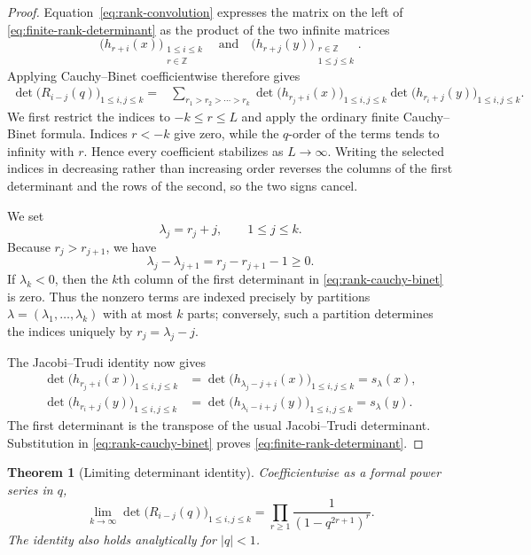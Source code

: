 \documentclass[11pt]{article}
\newtheorem{theorem}{Theorem}[section]
\theoremstyle{definition}
\theoremstyle{remark}
\begin{document}
\begin{proof}
Equation~\eqref{eq:rank-convolution} expresses the matrix on the left of
\eqref{eq:finite-rank-determinant} as the product of the two infinite matrices
\[
 \bigl(h_{r+i}(x)\bigr)_{\substack{1\leq i\leq k\\r\in\mathbb Z}}
 \quad\text{and}\quad
 \bigl(h_{r+j}(y)\bigr)_{\substack{r\in\mathbb Z\\1\leq j\leq k}}.
\]
Applying Cauchy--Binet coefficientwise therefore gives
\begin{align}
 \det\bigl(R_{i-j}(q)\bigr)_{1\leq i,j\leq k}
 ={}&\sum_{r_1>r_2>\cdots>r_k}
 \det\bigl(h_{r_j+i}(x)\bigr)_{1\leq i,j\leq k}
 \det\bigl(h_{r_i+j}(y)\bigr)_{1\leq i,j\leq k}.
 \label{eq:rank-cauchy-binet}
\end{align}
We first restrict the
indices to $-k\leq r\leq L$ and apply the ordinary finite Cauchy--Binet
formula.  Indices $r<-k$ give zero, while the $q$-order of the terms tends to
infinity with $r$.  Hence every coefficient stabilizes as $L\to\infty$.
Writing the selected indices in decreasing rather than increasing order
reverses the columns of the first determinant and the rows of the second, so
the two signs cancel.

We set
\[
 \lambda_j=r_j+j,
 \qquad 1\leq j\leq k.
\]
Because $r_j>r_{j+1}$, we have
\[
 \lambda_j-\lambda_{j+1}=r_j-r_{j+1}-1\geq0.
\]
If $\lambda_k<0$, then the $k$th column of the first determinant in
\eqref{eq:rank-cauchy-binet} is zero.  Thus the nonzero terms are indexed
precisely by partitions $\lambda=(\lambda_1,\ldots,\lambda_k)$ with at most
$k$ parts; conversely, such a partition determines the indices uniquely by
$r_j=\lambda_j-j$.

The Jacobi--Trudi identity now gives
\begin{align*}
 \det\bigl(h_{r_j+i}(x)\bigr)_{1\leq i,j\leq k}
 &=\det\bigl(h_{\lambda_j-j+i}(x)\bigr)_{1\leq i,j\leq k}
 =s_\lambda(x),\\
 \det\bigl(h_{r_i+j}(y)\bigr)_{1\leq i,j\leq k}
 &=\det\bigl(h_{\lambda_i-i+j}(y)\bigr)_{1\leq i,j\leq k}
 =s_\lambda(y).
\end{align*}
The first determinant is the transpose of the usual
Jacobi--Trudi determinant.  Substitution in
\eqref{eq:rank-cauchy-binet} proves \eqref{eq:finite-rank-determinant}.
\end{proof}

\begin{theorem}[Limiting determinant identity]\label{thm:limiting-rank-determinant}
Coefficientwise as a formal power series in $q$,
\begin{equation}\label{eq:limiting-rank-determinant}
 \lim_{k\to\infty}
 \det\bigl(R_{i-j}(q)\bigr)_{1\leq i,j\leq k}
 =\prod_{r\geq1}\frac{1}{(1-q^{2r+1})^r}.
\end{equation}
The identity also holds analytically for $|q|<1$.
\end{theorem}
\end{document}
